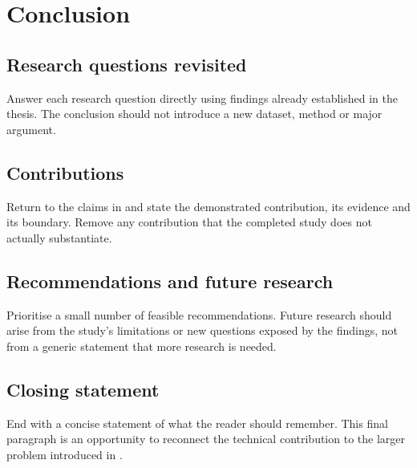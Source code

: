 \chapter{Conclusion}
\label{chap:conclusion}

\section{Research questions revisited}
Answer each research question directly using findings already established in the
thesis. The conclusion should not introduce a new dataset, method or major argument.

\section{Contributions}
Return to the claims in  and state the demonstrated
contribution, its evidence and its boundary. Remove any contribution that the completed
study does not actually substantiate.

\section{Recommendations and future research}
Prioritise a small number of feasible recommendations. Future research should arise
from the study's limitations or new questions exposed by the findings, not from a
generic statement that more research is needed.

\section{Closing statement}
End with a concise statement of what the reader should remember. This final paragraph
is an opportunity to reconnect the technical contribution to the larger problem
introduced in .

